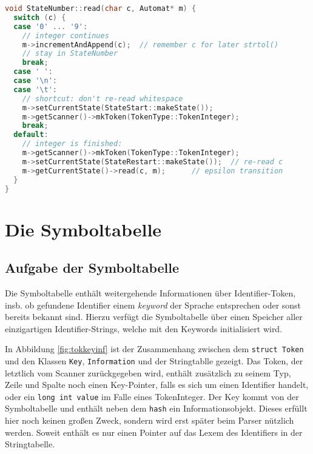 \documentclass[
a4paper,   %
11pt,      %
oneside,   %
onecolumn, %
final      %
]{article}
\newcommand{\code}[1]{\lstinline$#1$}
\begin{document}
\begin{lstlisting}[float, language=C++, firstnumber=116, caption={Ausscchnitt aus \texttt{states.cpp}. Die \code{read()}-Methode des Zustands \texttt{Number}.}, label=lst:state]
void StateNumber::read(char c, Automat* m) {
  switch (c) {
  case '0' ... '9':
    // integer continues
    m->incrementAndAppend(c);  // remember c for later strtol()
    // stay in StateNumber
    break;
  case ' ':
  case '\n':
  case '\t':
    // shortcut: don't re-read whitespace
    m->setCurrentState(StateStart::makeState());
    m->getScanner()->mkToken(TokenType::TokenInteger);
    break;
  default:
    // integer is finished:
    m->getScanner()->mkToken(TokenType::TokenInteger);
    m->setCurrentState(StateRestart::makeState());  // re-read c
    m->getCurrentState()->read(c, m);      // epsilon transition
  }
}
\end{lstlisting}



\section{Die Symboltabelle} \label{sec:symtab}

\subsection{Aufgabe der Symboltabelle}
Die Symboltabelle enthält weitergehende Informationen über Identifier-Token, insb. ob gefundene Identifier einem \emph{keyword} der Sprache entsprechen oder sonst bereits bekannt sind.
Hierzu verfügt die Symboltabelle über einen Speicher aller einzigartigen Identifier-Strings, welche mit den Keywords initialisiert wird.

In Abbildung \ref{fig:tokkeyinf} ist der Zusammenhang zwischen dem \code{struct Token} und den Klassen \code{Key}, \code{Information} und der Stringtablle gezeigt.
Das Token, der letztlich vom Scanner zurückgegeben wird, enthält zusätzlich zu seinem Typ, Zeile und Spalte noch einen Key-Pointer, falls es sich um einen Identifier handelt, oder ein \code{long int value} im Falle eines TokenInteger.
Der Key kommt von der Symboltabelle und enthält neben dem \code{hash} ein Informationsobjekt.
Dieses erfüllt hier noch keinen großen Zweck, sondern wird erst später beim Parser nützlich werden.
Soweit enthält es nur einen Pointer auf das Lexem des Identifiers in der Stringtabelle.
\end{document}
